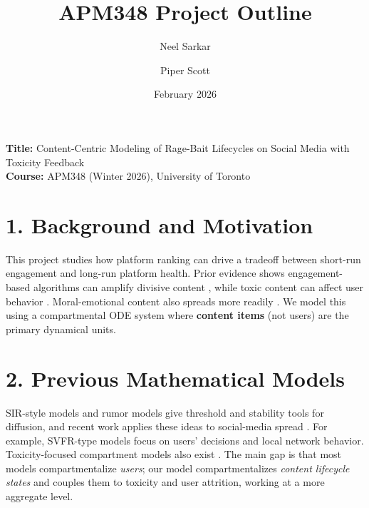 \documentclass[11pt]{article}
\title{APM348 Project Outline}
\author{Neel Sarkar \and Piper Scott}
\date{February 2026}
\begin{document}
\maketitle

\noindent
\textbf{Title:} Content-Centric Modeling of Rage-Bait Lifecycles on Social Media with Toxicity Feedback\\
\textbf{Course:} APM348 (Winter 2026), University of Toronto

\section*{1. Background and Motivation}
This project studies how platform ranking can drive a tradeoff between short-run engagement and long-run platform health. Prior evidence shows engagement-based algorithms can amplify divisive content \cite{huszar2022,milli2025}, while toxic content can affect user behavior \cite{beknazar2025}. Moral-emotional content also spreads more readily \cite{brady2017}. We model this using a compartmental ODE system where \textbf{content items} (not users) are the primary dynamical units.

\section*{2. Previous Mathematical Models}
SIR-style models and rumor models \cite{daleyKendall1964} give threshold and stability tools for diffusion, and recent work applies these ideas to social-media spread \cite{liShao2024}. For example, SVFR-type models focus on users' decisions and local network behavior. Toxicity-focused compartment models also exist \cite{maleki2022,addai2025}. The main gap is that most models compartmentalize \emph{users}; our model compartmentalizes \emph{content lifecycle states} and couples them to toxicity and user attrition, working at a more aggregate level.
\end{document}
